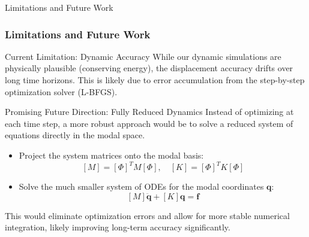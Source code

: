 \documentclass{beamer}
\begin{document}
\begin{frame}{Limitations and Future Work}
    \frametitle{Limitations and Future Work}
    
    \begin{block}{Current Limitation: Dynamic Accuracy}
        While our dynamic simulations are physically plausible (conserving energy), the displacement accuracy drifts over long time horizons. This is likely due to error accumulation from the step-by-step optimization solver (L-BFGS).
    \end{block}
    
    \begin{alertblock}{Promising Future Direction: Fully Reduced Dynamics}
        Instead of optimizing at each time step, a more robust approach would be to solve a reduced system of equations directly in the modal space.
        
        \begin{itemize}
            \item Project the system matrices onto the modal basis:
            \begin{equation*}
                \left[M\right] = \left[\Phi\right]^T M \left[\Phi\right], \quad \left[K\right] = \left[\Phi\right]^T K \left[\Phi\right]
            \end{equation*}
            
            \item Solve the much smaller system of ODEs for the modal coordinates \(\mathbf{q}\):
            \begin{equation*}
                \left[{M}\right] \ddot{\mathbf{q}} + \left[{K}\right] \mathbf{q} = \mathbf{f}
            \end{equation*}
        \end{itemize}
        This would eliminate optimization errors and allow for more stable numerical integration, likely improving long-term accuracy significantly.
    \end{alertblock}
\end{frame}
\end{document}
